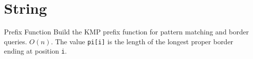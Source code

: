 \section{String}
\label{sec:string}

\AlgorithmEntry
  {Prefix Function}
  {Build the KMP prefix function for pattern matching and border queries.}
  {$O(n)$.}
  {The value \texttt{pi[i]} is the length of the longest proper border ending at position \texttt{i}.}


